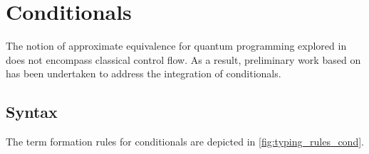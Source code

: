 \section{Conditionals}

The notion of approximate equivalence for quantum programming explored in \cite{dahlqvist2022syntactic} does not encompass classical control flow. As a result, preliminary work based on \cite{crole1993categories,selinger2013lecture}   has been undertaken to address the integration of conditionals. 

\subsection{Syntax}

The term formation rules for conditionals are depicted in
\autoref{fig:typing_rules_cond}. 

